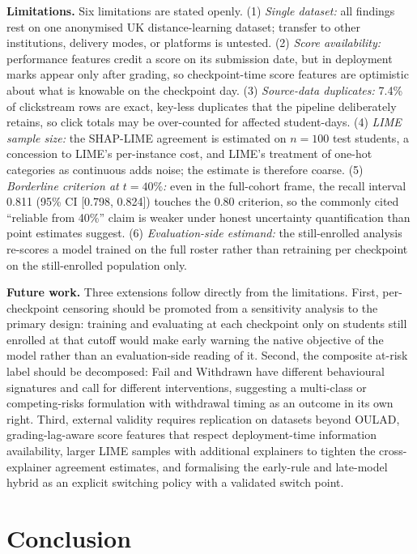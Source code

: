 \documentclass[conference]{IEEEtran}
\begin{document}
\textbf{Limitations.}
Six limitations are stated openly. (1) \emph{Single dataset:} all findings
rest on one anonymised UK distance-learning dataset; transfer to other
institutions, delivery modes, or platforms is untested. (2) \emph{Score
availability:} performance features credit a score on its submission date,
but in deployment marks appear only after grading, so checkpoint-time score
features are optimistic about what is knowable on the checkpoint day. (3)
\emph{Source-data duplicates:} 7.4\% of clickstream rows are exact,
key-less duplicates that the pipeline deliberately retains, so click totals
may be over-counted for affected student-days. (4) \emph{LIME sample size:}
the SHAP-LIME agreement is estimated on $n=100$ test students, a concession
to LIME's per-instance cost, and LIME's treatment of one-hot categories as
continuous adds noise; the estimate is therefore coarse. (5)
\emph{Borderline criterion at $t=40\%$:} even in the full-cohort frame, the
recall interval 0.811 (95\% CI [0.798, 0.824]) touches the 0.80 criterion,
so the commonly cited ``reliable from 40\%'' claim is weaker under honest
uncertainty quantification than point estimates suggest. (6)
\emph{Evaluation-side estimand:} the still-enrolled analysis re-scores a
model trained on the full roster rather than retraining per checkpoint on
the still-enrolled population only.

\textbf{Future work.}
Three extensions follow directly from the limitations. First, per-checkpoint
censoring should be promoted from a sensitivity analysis to the primary
design: training and evaluating at each checkpoint only on students still
enrolled at that cutoff would make early warning the native objective of the
model rather than an evaluation-side reading of it. Second, the composite
at-risk label should be decomposed: Fail and Withdrawn have different
behavioural signatures and call for different interventions, suggesting a
multi-class or competing-risks formulation with withdrawal timing as an
outcome in its own right. Third, external validity requires replication on
datasets beyond OULAD, grading-lag-aware score features that respect
deployment-time information availability, larger LIME samples with
additional explainers to tighten the cross-explainer agreement estimates,
and formalising the early-rule and late-model hybrid as an explicit
switching policy with a validated switch point.

\section{Conclusion}
\end{document}
